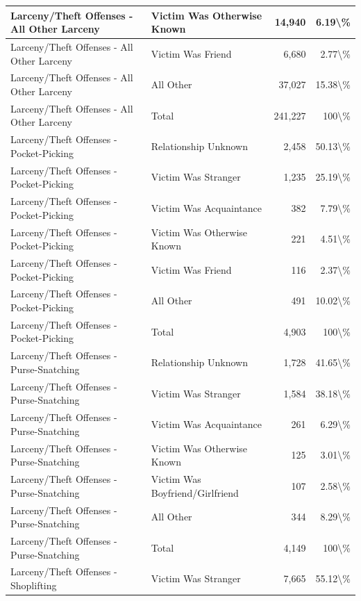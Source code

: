 \documentclass[
]{krantz}
\begin{document}
\begin{longtable}[t]{l|l|r|r}
\hline
Larceny/Theft Offenses - All Other Larceny & Victim Was Otherwise Known & 14,940 & 6.19\textbackslash{}\%\\
\hline
Larceny/Theft Offenses - All Other Larceny & Victim Was Friend & 6,680 & 2.77\textbackslash{}\%\\
\hline
Larceny/Theft Offenses - All Other Larceny & All Other & 37,027 & 15.38\textbackslash{}\%\\
\hline
Larceny/Theft Offenses - All Other Larceny & Total & 241,227 & 100\textbackslash{}\%\\
\hline
Larceny/Theft Offenses - Pocket-Picking & Relationship Unknown & 2,458 & 50.13\textbackslash{}\%\\
\hline
Larceny/Theft Offenses - Pocket-Picking & Victim Was Stranger & 1,235 & 25.19\textbackslash{}\%\\
\hline
Larceny/Theft Offenses - Pocket-Picking & Victim Was Acquaintance & 382 & 7.79\textbackslash{}\%\\
\hline
Larceny/Theft Offenses - Pocket-Picking & Victim Was Otherwise Known & 221 & 4.51\textbackslash{}\%\\
\hline
Larceny/Theft Offenses - Pocket-Picking & Victim Was Friend & 116 & 2.37\textbackslash{}\%\\
\hline
Larceny/Theft Offenses - Pocket-Picking & All Other & 491 & 10.02\textbackslash{}\%\\
\hline
Larceny/Theft Offenses - Pocket-Picking & Total & 4,903 & 100\textbackslash{}\%\\
\hline
Larceny/Theft Offenses - Purse-Snatching & Relationship Unknown & 1,728 & 41.65\textbackslash{}\%\\
\hline
Larceny/Theft Offenses - Purse-Snatching & Victim Was Stranger & 1,584 & 38.18\textbackslash{}\%\\
\hline
Larceny/Theft Offenses - Purse-Snatching & Victim Was Acquaintance & 261 & 6.29\textbackslash{}\%\\
\hline
Larceny/Theft Offenses - Purse-Snatching & Victim Was Otherwise Known & 125 & 3.01\textbackslash{}\%\\
\hline
Larceny/Theft Offenses - Purse-Snatching & Victim Was Boyfriend/Girlfriend & 107 & 2.58\textbackslash{}\%\\
\hline
Larceny/Theft Offenses - Purse-Snatching & All Other & 344 & 8.29\textbackslash{}\%\\
\hline
Larceny/Theft Offenses - Purse-Snatching & Total & 4,149 & 100\textbackslash{}\%\\
\hline
Larceny/Theft Offenses - Shoplifting & Victim Was Stranger & 7,665 & 55.12\textbackslash{}\%\\

\end{longtable}
\end{document}
